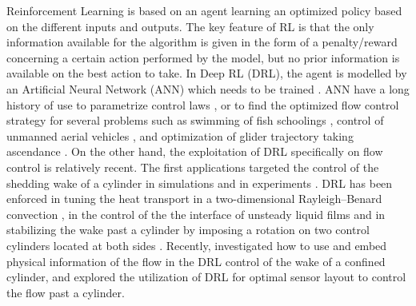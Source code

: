 Reinforcement Learning is based on an agent learning an optimized policy based on the different inputs and outputs. The key feature of RL is that the only information available for the algorithm is given in the form of a penalty/reward concerning a certain action performed by the model, but no prior information is available on the best action to take. In Deep RL (DRL), the agent is modelled by an Artificial Neural Network (ANN) which needs to be trained \citep{rabault2019DRL}. ANN  have a long history of use to parametrize control laws \citep{Lee1997NN}, or to find the optimized flow control strategy for several problems such as swimming of fish schoolings \citep{gazzola2014RL}, control of unmanned aerial vehicles \citep{bohn2019DRL}, and optimization of glider trajectory taking ascendance \citep{reddy_learning_2016}. On the other hand, the exploitation of DRL specifically on flow control is relatively recent. The first applications targeted the control of the shedding wake of a cylinder in simulations \citep{rabault2019DRL,rabault2019JFM} and in experiments \citep{Fan2020}. 
DRL has been enforced in tuning the heat transport in a two-dimensional Rayleigh–Benard convection \citep{Beintema2020}, in the control of the the interface of unsteady liquid films \citep{Belus2019} and in stabilizing the wake past a cylinder by imposing a rotation on two control cylinders located at both sides \citep{Xu2020joh}. 
Recently, \citet{li2021ReLe} investigated how to use and embed physical information of the flow in the DRL control of the wake of a confined cylinder, and \citet{paris2021} explored the utilization of DRL for optimal sensor layout to control the flow past a cylinder.

